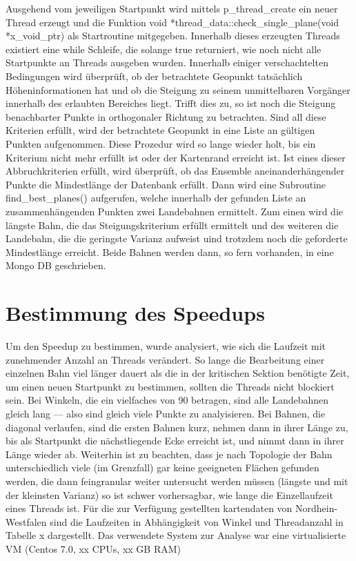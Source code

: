 \documentclass[10pt,a4paper]{report}
\begin{document}
Ausgehend vom jeweiligen Startpunkt wird mittels p\_thread\_create ein neuer Thread erzeugt und die Funktion void *thread\_data::check\_single\_plane(void *x\_void\_ptr) als Startroutine mitgegeben. Innerhalb dieses erzeugten Threads existiert eine while Schleife, die solange true returniert, wie noch nicht alle Startpunkte an Threads ausgeben wurden.
Innerhalb einiger verschachtelten Bedingungen wird überprüft, ob der betrachtete Geopunkt tatsächlich Höheninformationen hat und ob die Steigung zu seinem unmittelbaren Vorgänger innerhalb des erlaubten Bereiches liegt.
Trifft dies zu, so ist noch die Steigung benachbarter Punkte in orthogonaler Richtung zu betrachten. Sind all diese Kriterien erfüllt, wird der betrachtete Geopunkt in eine Liste an gültigen Punkten aufgenommen. Diese Prozedur wird so lange wieder holt, bis ein Kriterium nicht mehr erfüllt ist oder der Kartenrand erreicht ist.
Ist eines dieser Abbruchkriterien erfüllt, wird überprüft, ob das Ensemble aneinanderhängender Punkte die Mindestlänge der Datenbank erfüllt.
Dann wird eine Subroutine find\_best\_planes() aufgerufen, welche innerhalb der gefunden Liste an zusammenhängenden Punkten zwei Landebahnen ermittelt. Zum einen wird die längste Bahn, die das Steigungskriterium erfüllt ermittelt und des weiteren die Landebahn, die die geringste Varianz aufweist uind trotzdem noch die geforderte Mindestlänge erreicht. 
Beide Bahnen werden dann, so fern vorhanden, in eine Mongo DB geschrieben.

\section{Bestimmung des Speedups}

Um den Speedup zu bestimmen, wurde analysiert, wie sich die Laufzeit mit zunehmender Anzahl an Threads verändert. So lange die Bearbeitung einer einzelnen Bahn viel länger dauert als die in der kritischen Sektion benötigte Zeit, um einen neuen Startpunkt zu bestimmen, sollten die Threads nicht blockiert sein.
Bei Winkeln, die ein vielfaches von 90\° betragen, sind alle Landebahnen gleich lang --- also sind gleich viele Punkte zu analyisieren.
Bei Bahnen, die diagonal verlaufen, sind die ersten Bahnen kurz, nehmen dann in ihrer Länge zu, bis als Startpunkt die nächstliegende Ecke  erreicht ist, und nimmt dann in ihrer Länge wieder ab. Weiterhin ist zu beachten, dass je nach Topologie der Bahn unterschiedlich viele (im Grenzfall) gar keine geeigneten Flächen gefunden werden, die dann feingranular weiter untersucht werden müssen (längste und mit der kleinsten Varianz) so ist schwer vorhersagbar, wie lange die Einzellaufzeit eines Threads ist.
Für die zur Verfügung gestellten kartendaten von Nordhein-Westfalen sind die Laufzeiten in Abhängigkeit von Winkel und Threadanzahl in Tabelle x dargestellt. Das verwendete System zur Analyse war eine virtualisierte VM (Centos 7.0, xx CPUs, xx GB RAM) 
\end{document}
